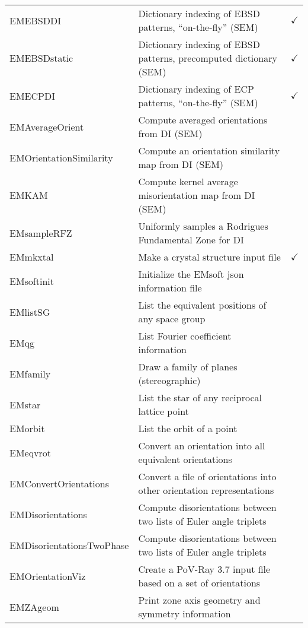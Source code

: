 \documentclass[DIV=calc, paper=letter, fontsize=11pt]{scrartcl}	 %
\begin{document}
\begin{table*}[h]
{\begin{tabular}{|l|l|c|}
    {\color{blue}\textsf{EMEBSDDI}} & Dictionary indexing of EBSD patterns, ``on-the-fly'' (SEM) & $\checkmark$\\
    {\color{blue}\textsf{EMEBSDstatic}} & Dictionary indexing of EBSD patterns, precomputed dictionary (SEM) &$\checkmark$ \\
    {\color{blue}\textsf{EMECPDI}} & Dictionary indexing of ECP patterns, ``on-the-fly'' (SEM) &$\checkmark$ \\
    {\color{blue}\textsf{EMAverageOrient}} & Compute averaged orientations from DI (SEM) & \\
    {\color{blue}\textsf{EMOrientationSimilarity}} & Compute an orientation similarity map from DI (SEM) & \\
    {\color{blue}\textsf{EMKAM}} & Compute kernel average misorientation map from DI (SEM) & \\
    {\color{blue}\textsf{EMsampleRFZ}} & Uniformly samples a Rodrigues Fundamental Zone for DI& \\
\hline
  \textsf{EMmkxtal} & Make a crystal structure input file& $\checkmark$\\
  {\color{blue}\textsf{EMsoftinit}} & Initialize the \textsf{EMsoft} json information file & \\
  \textsf{EMlistSG} & List the equivalent positions of any space group & \\
  \textsf{EMqg} & List Fourier coefficient information & \\
  \textsf{EMfamily} & Draw a family of planes (stereographic) & \\
  \textsf{EMstar} & List the star of any reciprocal lattice point & \\
  \textsf{EMorbit} & List the orbit of a point & \\
    {\color{blue}\textsf{EMeqvrot}} & Convert an orientation into all equivalent orientations & \\
    {\color{blue}\textsf{EMConvertOrientations}} & Convert a file of orientations into other orientation representations & \\
    {\color{blue}\textsf{EMDisorientations}} & Compute disorientations between two lists of Euler angle triplets & \\
    {\color{blue}\textsf{EMDisorientationsTwoPhase}} & Compute disorientations between two lists of Euler angle triplets & \\
    {\color{blue}\textsf{EMOrientationViz}} & Create a PoV-Ray 3.7 input file based on a set of orientations & \\
  \textsf{EMZAgeom} & Print zone axis geometry and symmetry information & \\

\end{tabular}}
\end{table*}
\end{document}
